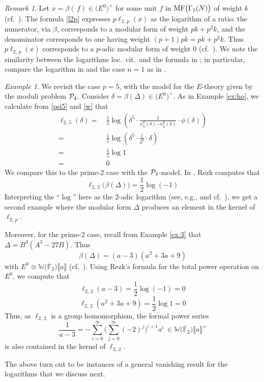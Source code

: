 \documentclass{gtpart}
\theoremstyle{definition}
\theoremstyle{remark}
\newtheorem{rmk}[thm]{Remark}
\newtheorem{ex}[thm]{Example}
\newcommand{\mb}[1]{\mathbb{#1}}
\newcommand{\cF}{\overline {\mb F}}
\newcommand{\CP}{{\cal P}}
\newcommand{\BW}{{\mb W}}
\newcommand{\MF}{{\rm MF}}
\newcommand{\B}{\beta}
\renewcommand{\D}{\Delta}
\renewcommand{\d}{\delta}
\newcommand{\G}{\Gamma}
\newcommand{\lb}{\llbracket}
\newcommand{\rb}{\rrbracket}
\renewcommand{\=}{\approx}
\renewcommand{\-}{\sim}
\numberwithin{equation}{section}
\numberwithin{thm}{section}
\begin{document}
\begin{rmk}
 \label{rmk:ratio}
 Let $x = \B(\,f) \in \big( E^0 \big)^{\!\times}$ for some unit 
 $f$ in $\MF\big(\G_1(N)\big)$ of weight $k$ (cf.~\cite{KubertLang}).  
 The formula \eqref{l2p} expresses $p \ell_{2,\,p}(x)$ as the logarithm of a ratio: 
 the numerator, via $\B$, corresponds to a modular form of weight $p k + p^2 k$, 
 and the denominator corresponds to one having weight $(p + 1) p k = p k + p^2 k$.  
 Thus $p \ell_{2,\,p}(x)$ corresponds to a $p$-adic modular form of weight 0 (cf.~\cite[Section 10.1]{padicinterp}).  
 We note the similarity between the logarithms loc.~cit.~and the formula in \cite[Theorem 1.11]{log}; 
 in particular, compare the logarithm in \cite[10.2.7]{padicinterp} and the case $n = 1$ as in \cite[Theorem 1.9]{log}.  
\end{rmk}

\begin{ex}
 \label{ex:log}
 We revisit the case $p = 5$, with the model for the $E$-theory given by the moduli problem $\CP_4$.  
 Consider $\d = \B(\D) \in \big( E^0 \big)^{\!\times}$.  
 As in Example \ref{ex:ho}, we calculate from \eqref{psi5} and \eqref{w} that 
 \begin{equation*}
  \begin{split}
   \ell_{2,\,5}(\d) = & ~ \frac{1}{5} \log \left( \d^5 \cdot \frac{1}{\psi^p_0(\d) \cdots \psi^p_p(\d)} \cdot \phi(\d) \right) \\
                  = & ~ \frac{1}{5} \log \left( \d^5 \cdot \frac{1}{\d^6} \cdot \d \right) \\
                  = & ~ \frac{1}{5} \log 1 \\
                  = & ~ 0 
  \end{split}
 \end{equation*}
 We compare this to the prime-2 case with the $\CP_3$-model.  
 In \cite[2.8]{h2p2}, Rezk computes that 
 \[
  \ell_{2,\,2}\big(\B(\D)\big) = \frac{1}{2} \log(-1) 
 \]
 Interpreting the ``$\log$'' here as the 2-adic logarithm (see, e.g., \cite[\S IV.1]{padic} and cf.~\cite[10.2.16]{padicinterp}), 
 we get a second example where the modular form $\D$ produces an element in the kernel of $\ell_{2,\,p}$.  

 Moreover, for the prime-2 case, recall from Example \ref{ex:3} that $\D = B^3 (A^3 - 27 B)$.  
 Thus 
 \[
  \B(\D) = (a - 3) (a^2 + 3 a + 9) 
 \]
 with $E^0 \cong \BW \big( \cF_2 \big) \lb a \rb$ (cf.~\cite[Section 4]{h2p2}).  
 Using Rezk's formula for the total power operation on $E^0$, we compute that 
 \[
  \ell_{2,\,2}(a - 3) = \frac{1}{2} \log(-1) = 0 
 \]
 \[
  \ell_{2,\,2}(a^2 + 3 a + 9) = \frac{1}{2} \log 1 = 0 
 \]
 Thus, as $\ell_{2,\,2}$ is a group homomorphism, the formal power series 
 \[
  \frac{1}{a - 3} = -\sum_{i = 0}^\infty \Big( \sum_{j = 0}^\infty (-2)^j \Big)^{i + 1} a^i ~ \in \BW \big( \cF_2 \big) \lb a \rb^\times 
 \]
 is also contained in the kernel of $\ell_{2,\,2}$.  

 The above turn out to be instances of a general vanishing result for the logarithms that we discuss next.  
\end{ex}
\end{document}
